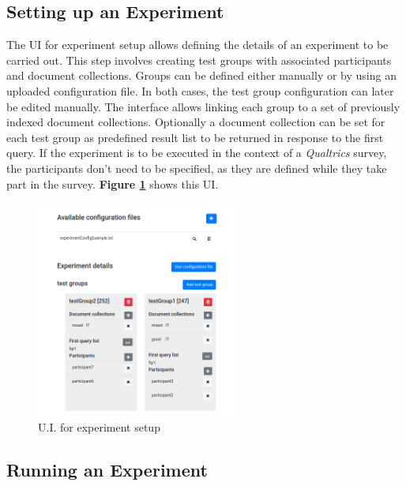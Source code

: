 \documentclass[a4paper]{usiinfbachelorproject}
\begin{document}
\subsection{\textbf{Setting up an Experiment}} \label{sec:designExpSetup}

The UI for experiment setup allows defining the details of an experiment to be carried out. This step involves creating
test groups with associated participants and document collections. Groups can be defined either manually or by using 
an uploaded configuration file. In both cases, the test group configuration can later be edited manually. 
The interface allows linking each group to a set of previously indexed document collections. Optionally a document collection
can be set for each test group as predefined result list to be returned in response to the first query.
If the experiment is to be executed in the context of a \emph{Qualtrics} survey, the participants don't need to be specified, as they are
defined while they take part in the survey. 
\textbf{Figure \ref{fig:setup}} shows this UI.

\begin{figure}[h!]
\centering
\includegraphics[width=0.6\textwidth]{figures/setup}
\caption{U.I. for experiment setup}
\label{fig:setup}
\end{figure}


\subsection{\textbf{Running an Experiment}} \label{sec:designExpRun}
\end{document}

